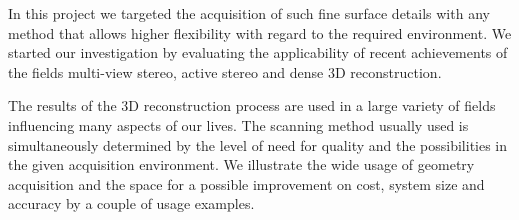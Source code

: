 \documentclass{ucl_thesis}
\begin{document}
\par In this project we targeted the acquisition of such fine surface details with any method that allows higher flexibility with regard to the required environment. We started our investigation by evaluating the applicability of recent achievements of the fields multi-view stereo, active stereo and dense 3D reconstruction. 
\par The results of the 3D reconstruction process are used in a large variety of fields influencing many aspects of our lives. The scanning method usually used is simultaneously determined by the level of need for quality and the possibilities in the given acquisition environment. We illustrate the wide usage of geometry acquisition and the space for a possible improvement on cost, system size and accuracy by a couple of usage examples.
\end{document}
